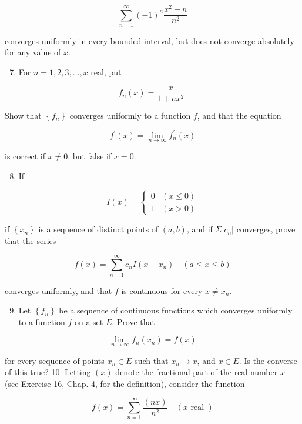 \documentclass[10pt]{article}
\begin{document}
$$
\sum_{n=1}^{\infty}(-1)^{n} \frac{x^{2}+n}{n^{2}}
$$

converges uniformly in every bounded interval, but does not converge absolutely for any value of $x$.

\begin{enumerate}
  \setcounter{enumi}{6}
  \item For $n=1,2,3, \ldots, x$ real, put
\end{enumerate}

$$
f_{n}(x)=\frac{x}{1+n x^{2}} .
$$

Show that $\left\{f_{n}\right\}$ converges uniformly to a function $f$, and that the equation

$$
f^{\prime}(x)=\lim _{n \rightarrow \infty} f_{n}^{\prime}(x)
$$

is correct if $x \neq 0$, but false if $x=0$.

\begin{enumerate}
  \setcounter{enumi}{7}
  \item If
\end{enumerate}

$$
I(x)= \begin{cases}0 & (x \leq 0) \\ 1 & (x>0)\end{cases}
$$

if $\left\{x_{n}\right\}$ is a sequence of distinct points of $(a, b)$, and if $\Sigma\left|c_{n}\right|$ converges, prove that the series

$$
f(x)=\sum_{n=1}^{\infty} c_{n} I\left(x-x_{n}\right) \quad(a \leq x \leq b)
$$

converges uniformly, and that $f$ is continuous for every $x \neq x_{n}$.

\begin{enumerate}
  \setcounter{enumi}{8}
  \item Let $\left\{f_{n}\right\}$ be a sequence of continuous functions which converges uniformly to a function $f$ on a set $E$. Prove that
\end{enumerate}

$$
\lim _{n \rightarrow \infty} f_{n}\left(x_{n}\right)=f(x)
$$

for every sequence of points $x_{n} \in E$ such that $x_{n} \rightarrow x$, and $x \in E$. Is the converse of this true? 10. Letting $(x)$ denote the fractional part of the real number $x$ (see Exercise 16, Chap. 4, for the definition), consider the function

$$
f(x)=\sum_{n=1}^{\infty} \frac{(n x)}{n^{2}} \quad(x \text { real })
$$
\end{document}
